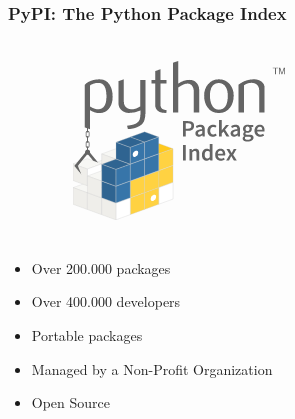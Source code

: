 \documentclass{beamer}
\begin{document}
\begin{frame}
    \frametitle{PyPI: The Python Package Index}
    \begin{figure}
        \includegraphics[scale=0.3]{imgs/pipy.png}
    \end{figure}
    \begin{itemize}
        \item Over 200.000 packages
        \item Over 400.000 developers
        \item Portable packages
        \item Managed by a Non-Profit Organization
        \item Open Source
    \end{itemize}
\end{frame}
\end{document}

